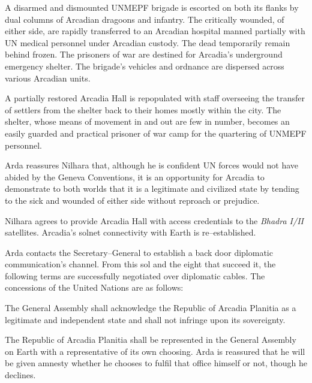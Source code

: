 

A disarmed and dismounted UNMEPF brigade is escorted on both its flanks by dual columns of Arcadian dragoons and infantry. The critically wounded, of either side, are rapidly transferred to an Arcadian hospital manned partially with UN medical personnel under Arcadian custody. The dead temporarily remain behind frozen. The prisoners of war are destined for Arcadia's underground emergency shelter. The brigade's vehicles and ordnance are dispersed across various Arcadian units.

A partially restored Arcadia Hall is repopulated with staff overseeing the transfer of settlers from the shelter back to their homes mostly within the city. The shelter, whose means of movement in and out are few in number, becomes an easily guarded and practical prisoner of war camp for the quartering of UNMEPF personnel.

Arda reassures Nilhara that, although he is confident UN forces would not have abided by the Geneva Conventions, it is an opportunity for Arcadia to demonstrate to both worlds that it is a legitimate and civilized state by tending to the sick and wounded of either side without reproach or prejudice.
\StopTimelineDate

Nilhara agrees to provide Arcadia Hall with access credentials to the {\it Bhadra I/II} satellites. Arcadia's solnet connectivity with Earth is re--established.

Arda contacts the Secretary--General to establish a back door diplomatic communication's channel. From this sol and the eight that succeed it, the following terms are successfully negotiated over diplomatic cables. The concessions of the United Nations are as follows:

\startitemize[R]
\item The General Assembly shall acknowledge the Republic of Arcadia Planitia as a legitimate and independent state and shall not infringe upon its sovereignty.

\item The Republic of Arcadia Planitia shall be represented in the General Assembly on Earth with a representative of its own choosing. Arda is reassured that he will be given amnesty whether he chooses to fulfil that office himself or not, though he declines.

